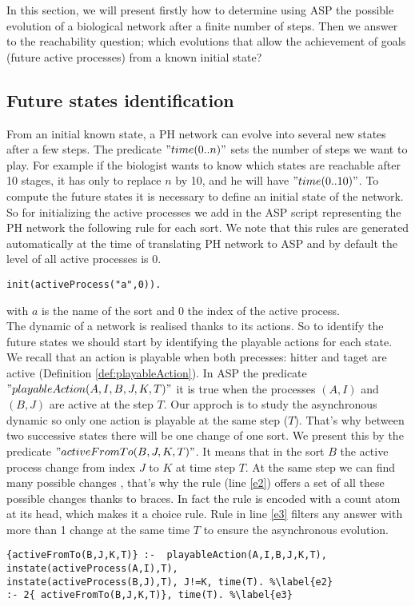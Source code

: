 
In this section, we will present firstly how to determine using ASP the possible evolution of a biological network after a finite number of steps. Then we answer to the reachability question; which evolutions that allow the achievement of goals (future active processes) from a known initial state?

\subsection{Future states identification }
From an initial known state, a PH network can evolve into several new states after a few steps. The predicate $"time (0 .. n)"$ sets the number of steps we want to play. For example if the biologist wants to know which states are reachable after 10 stages, it has only to replace $n$ by 10, and he will have $"time (0 .. 10)"$. To compute the future states it is necessary to define an initial state of the network. So for initializing the active processes we add in the ASP script representing the PH network the following rule for each sort. We note that this rules are generated automatically at the time of translating PH network to ASP and by default the level of all active processes is $0$.\\
\begin{lstlisting}
init(activeProcess("a",0)).
\end{lstlisting}
with $a$ is the name of the sort and $0$ the index of the active process.\\
The dynamic of a network is realised thanks to its actions. So to identify the future states we should start by identifying the playable actions for each state. We recall that an action is playable when both precesses: hitter and taget are active (Definition \ref{def:playableAction}). In ASP the predicate $"playableAction(A,I,B,J,K,T)"$ it is true when the processes $(A,I)$ and $(B,J)$ are active at the step $T$.
Our approch is to study the asynchronous dynamic so only one action is playable at the same step ($T$). That's why between two successive states there will be one change of one sort. We present this by the predicate $"activeFromTo(B,J,K,T)"$. It means that in the sort $B$ the active process change from index $J$ to $K$ at time step $T$.
At the same step we can find many possible changes , that's why the rule (line \ref{e2}) offers a set of all these possible changes thanks to braces.
In fact the rule is encoded with a count atom at its head, which makes it a choice rule. Rule in line \ref{e3} filters any answer with more than 1 change at the same time $T$ to ensure the asynchronous evolution.
\begin{lstlisting}
{activeFromTo(B,J,K,T)} :-  playableAction(A,I,B,J,K,T), instate(activeProcess(A,I),T),
instate(activeProcess(B,J),T), J!=K, time(T). %\label{e2}
:- 2{ activeFromTo(B,J,K,T)}, time(T). %\label{e3}
\end{lstlisting}

